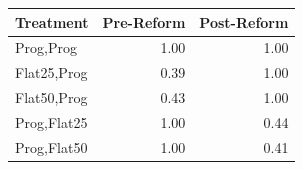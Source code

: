 \begin{tabular}{lrr}
\toprule
Treatment & Pre-Reform & Post-Reform \\
\midrule
Prog,Prog & 1.00 & 1.00 \\
Flat25,Prog & 0.39 & 1.00 \\
Flat50,Prog & 0.43 & 1.00 \\
Prog,Flat25 & 1.00 & 0.44 \\
Prog,Flat50 & 1.00 & 0.41 \\
\bottomrule
\end{tabular}

